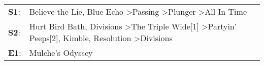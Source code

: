 \begin{supertabular}{p{0.03\textwidth}p{0.92\textwidth}}
 \textbf{S1}:  &                                                                                              Believe the Lie\textsuperscript{}, \enspace Blue Echo\textsuperscript{} \textgreater \enspace Passing\textsuperscript{} \textgreater \enspace Plunger\textsuperscript{} \textgreater \enspace All In Time\textsuperscript{}  \enspace  \\
 \textbf{S2}:  &  Hurt Bird Bath\textsuperscript{}, \enspace Divisions\textsuperscript{} \textgreater \enspace The Triple Wide[1]\textsuperscript{} \textgreater \enspace Partyin' Peeps[2]\textsuperscript{}, \enspace Kimble\textsuperscript{}, \enspace Resolution\textsuperscript{} \textgreater \enspace Divisions\textsuperscript{}  \enspace  \\
 \textbf{E1}:  &                                                                                                                                                                                                                                                                                       Mulche's Odyssey\textsuperscript{}  \enspace  \\
\end{supertabular}

